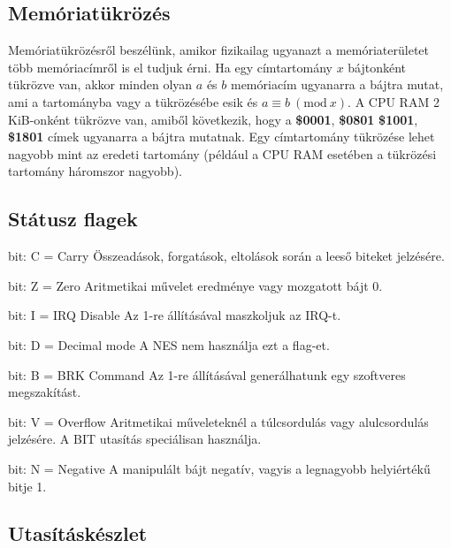 \subsection{Memóriatükrözés}
Memóriatükrözésről beszélünk, amikor fizikailag ugyanazt a memóriaterületet több memóriacímről is el tudjuk érni. Ha egy címtartomány $x$ bájtonként tükrözve van, akkor minden olyan $a$ és $b$ memóriacím ugyanarra a bájtra mutat, ami a tartományba vagy a tükrözésébe esik és $a \equiv b\ (\textrm{mod}\ x)$.  A CPU RAM 2 KiB-onként tükrözve van, amiből következik, hogy a \textbf{\$0001}, \textbf{\$0801} \textbf{\$1001}, \textbf{\$1801} címek ugyanarra a bájtra mutatnak. Egy címtartomány tükrözése lehet nagyobb mint az eredeti tartomány (például a CPU RAM esetében a tükrözési tartomány háromszor nagyobb).

\subsection{Státusz flagek}

\begin{compactenum}
	\setcounter{enumi}{-1}
	\item bit: C = Carry \newline Összeadások, forgatások, eltolások során a leeső biteket jelzésére.
	\item bit: Z = Zero   \newline Aritmetikai művelet eredménye vagy mozgatott bájt 0.
	\item bit: I = IRQ Disable
	\newline Az 1-re állításával maszkoljuk az IRQ-t.
	\item bit: D = Decimal mode
	\newline
	A NES nem használja ezt a flag-et.
	\item bit: B = BRK Command
	\newline Az 1-re állításával generálhatunk egy szoftveres megszakítást. 
	\setcounter{enumi}{5}
	\item bit: V = Overflow
	\newline 
	Aritmetikai műveleteknél a túlcsordulás vagy alulcsordulás jelzésére.
	A BIT utasítás speciálisan használja.
	\item bit: N = Negative
	\newline A manipulált bájt negatív, vagyis a legnagyobb helyiértékű bitje 1.
\end{compactenum}

\subsection{Utasításkészlet}
\label{instructionset}

